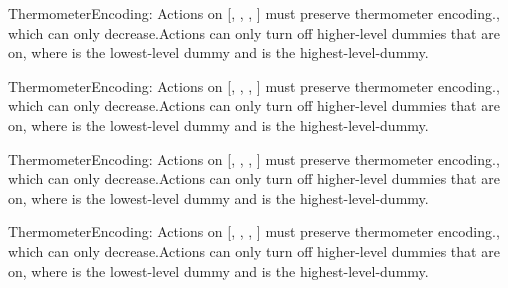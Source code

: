 \begin{constraints}
\item ThermometerEncoding: Actions on [, , , ] must preserve thermometer encoding., which can only decrease.Actions can only turn off higher-level dummies that are on, where  is the lowest-level dummy and  is the highest-level-dummy.
\item ThermometerEncoding: Actions on [, , , ] must preserve thermometer encoding., which can only decrease.Actions can only turn off higher-level dummies that are on, where  is the lowest-level dummy and  is the highest-level-dummy.
\item ThermometerEncoding: Actions on [, , , ] must preserve thermometer encoding., which can only decrease.Actions can only turn off higher-level dummies that are on, where  is the lowest-level dummy and  is the highest-level-dummy.
\item ThermometerEncoding: Actions on [, , , ] must preserve thermometer encoding., which can only decrease.Actions can only turn off higher-level dummies that are on, where  is the lowest-level dummy and  is the highest-level-dummy.
\end{constraints}
